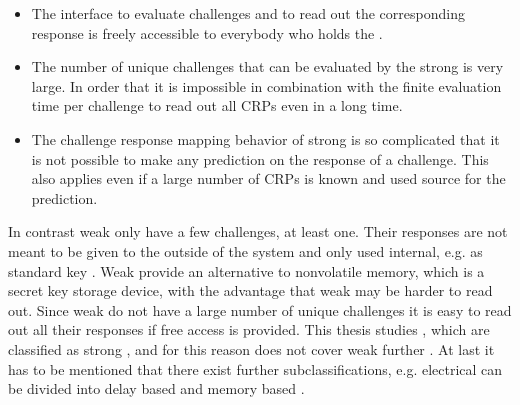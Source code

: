\begin{itemize}
\item The interface to evaluate challenges and to read out the corresponding response is freely accessible to everybody who holds the \puf.
\item The number of unique challenges that can be evaluated by the strong \puf is very large.
In order that it is impossible in combination with the finite evaluation time per challenge to read out all \acp{CRP} even in a long time.
\item The challenge response mapping behavior of strong \pufs is so complicated that it is not possible to make any prediction on the response of a challenge. 
This also applies even if a large number of \acp{CRP} is known and used source for the prediction.
\end{itemize}

In contrast weak \pufs only have a few challenges, at least one.
Their responses are not meant to be given to the outside of the system and only used internal, e.g. as standard key \cite{Ruhrmair2012AnPUFs}.
Weak \pufs provide an alternative to nonvolatile memory, which is a secret key storage device, with the advantage that weak \pufs may be harder to read out. %
Since weak \pufs do not have a large number of unique challenges it is easy to read out all their responses if free access is provided.
This thesis studies \apufs, which are classified as strong \puf, and for this reason does not cover weak \pufs further \cite{Ruhrmair2010StrongProofs}.
At last it has to be mentioned that there exist further subclassifications, e.g. electrical \pufs can be divided into delay based \pufs and memory based \pufs. %


